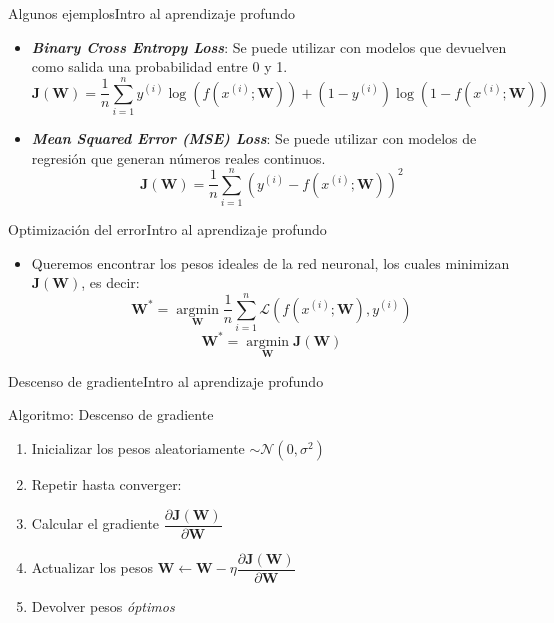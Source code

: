 \documentclass[10pt,border=3pt,tikz]{beamer}
\begin{document}
    \begin{frame}{Algunos ejemplos}{Intro al aprendizaje profundo}
        \begin{itemize}
            \item \textit{\textbf{Binary Cross Entropy Loss}}:
            Se puede utilizar con modelos que devuelven como salida una probabilidad entre 0 y 1.
            $$\mathbf{J(W)} = \displaystyle \dfrac{1}{n}\sum_{i=1}^n y^{(i)} \log(f(x^{(i)}; \mathbf{W})) + (1 - y^{(i)}) \log(1 - f(x^{(i)}; \mathbf{W}))$$
            \item \textit{\textbf{Mean Squared Error (MSE) Loss}}:
            Se puede utilizar con modelos de regresión que generan números reales continuos.
            $$\mathbf{J(W)} = \displaystyle \dfrac{1}{n}\sum_{i=1}^n \left( y^{(i)} - f(x^{(i)}; \mathbf{W})\right)^2$$
        \end{itemize}
    \end{frame}
    
    \begin{frame}{Optimización del error}{Intro al aprendizaje profundo}
        \begin{itemize}
            \item Queremos encontrar los pesos ideales de la red neuronal, los cuales minimizan $\mathbf{J(W)}$, es decir:
            $$\mathbf{W^*} = \displaystyle \operatorname*{argmin}_\mathbf{W} \dfrac{1}{n}\sum_{i=1}^n \mathcal{L}(f(x^{(i)}; \mathbf{W}), y^{(i)})$$
            $$\mathbf{W^*} = \displaystyle \operatorname*{argmin}_\mathbf{W} \mathbf{J(W)}$$
        \end{itemize}
    \end{frame}
    
    \begin{frame}{Descenso de gradiente}{Intro al aprendizaje profundo}
        \begin{block}{Algoritmo: Descenso de gradiente}
            \begin{enumerate}
                \item Inicializar los pesos aleatoriamente $\sim \mathcal{N}(0,\sigma^2)$
                \item Repetir hasta converger:
                \item \hspace*{8pt} Calcular el gradiente $\dfrac{\partial \mathbf{J(W)}}{\partial \mathbf{W}}$
                \item \hspace*{8pt} Actualizar los pesos $\mathbf{W} \leftarrow \mathbf{W} - \eta \dfrac{\partial \mathbf{J(W)}}{\partial \mathbf{W}}$
                \item Devolver pesos \textit{óptimos}
            \end{enumerate}
        \end{block}
    \end{frame}
    
\end{document}
